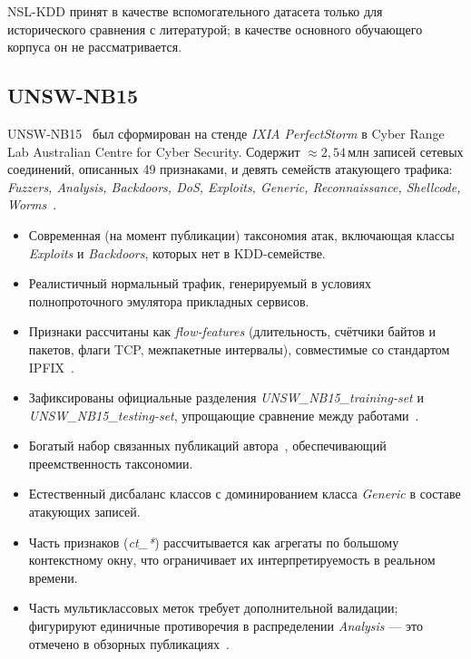 NSL-KDD принят в качестве вспомогательного датасета только для исторического
сравнения с литературой; в качестве основного обучающего корпуса он не
рассматривается.

\subsection{UNSW-NB15}

UNSW-NB15~\cite{moustafa2015unsw, moustafa2016eval, unswportal} был
сформирован на стенде \emph{IXIA PerfectStorm} в Cyber Range Lab Australian
Centre for Cyber Security. Содержит \(\approx 2{,}54\,\text{млн}\) записей
сетевых соединений, описанных 49 признаками, и девять семейств атакующего
трафика: \emph{Fuzzers, Analysis, Backdoors, DoS, Exploits, Generic,
Reconnaissance, Shellcode, Worms}~\cite{moustafa2015unsw}.

\begin{description}[font=\normalfont\itshape, leftmargin=1.5em]
    \item[Сильные стороны:]
    \begin{itemize}
        \item Современная (на момент публикации) таксономия атак, включающая
        классы \emph{Exploits} и \emph{Backdoors}, которых нет в KDD-семействе.
        \item Реалистичный нормальный трафик, генерируемый в условиях
        полнопроточного эмулятора прикладных сервисов.
        \item Признаки рассчитаны как \emph{flow-features} (длительность,
        счётчики байтов и пакетов, флаги TCP, межпакетные интервалы),
        совместимые со стандартом IPFIX~\cite{rfc7011}.
        \item Зафиксированы официальные разделения \emph{UNSW\_NB15\_training-set}
        и \emph{UNSW\_NB15\_testing-set}, упрощающие сравнение между
        работами~\cite{moustafa2016eval}.
        \item Богатый набор связанных публикаций
        автора~\cite{moustafa2016eval, koroniotis2019botiot,
        moustafa2021toniot}, обеспечивающий преемственность таксономии.
    \end{itemize}
    \item[Ограничения:]
    \begin{itemize}
        \item Естественный дисбаланс классов с доминированием класса
        \emph{Generic} в составе атакующих записей.
        \item Часть признаков (\emph{ct\_*}) рассчитывается как агрегаты по
        большому контекстному окну, что ограничивает их интерпретируемость в
        реальном времени.
        \item Часть мультиклассовых меток требует дополнительной валидации;
        фигурируют единичные противоречия в распределении \emph{Analysis} ---
        это отмечено в обзорных
        публикациях~\cite{moustafa2016eval}.
    \end{itemize}
\end{description}

